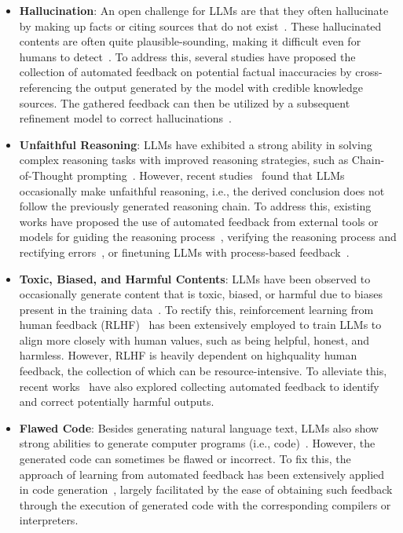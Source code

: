 \documentclass[a4paper,oneside]{book}
\begin{document}
\begin{itemize}
    \item \textbf{Hallucination}: An open challenge for LLMs are that they often hallucinate by making up facts or citing sources that do not exist~\cite{li2023halueval, zhang2023language}. These hallucinated contents are often quite plausible-sounding, making it difficult even for humans to detect~\cite{clark2021thats}. To address this, several studies have proposed the collection of automated feedback on potential factual inaccuracies by cross-referencing the output generated by the model with credible knowledge sources. The gathered feedback can then be utilized by a subsequent refinement model to correct hallucinations~\cite{gao2023rarr, zhang2023language}.

    \item \textbf{Unfaithful Reasoning}: LLMs have exhibited a strong ability in solving complex reasoning tasks with improved reasoning strategies, such as Chain-of-Thought prompting~\cite{wei2023chainofthought}. However, recent studies~\cite{golovneva2023roscoe, ribeiro2023street, lyu2023faithful} found that LLMs occasionally make unfaithful reasoning, i.e., the derived conclusion does not follow the previously generated reasoning chain. To address this, existing works have proposed the use of automated feedback from external tools or models for guiding the reasoning process~\cite{xie2023selfevaluation, yao2023tree}, verifying the reasoning process and rectifying errors~\cite{he2022rethinking, pan2023logiclm}, or finetuning LLMs with process-based feedback~\cite{huang2022large, lightman2023lets}.

    \item \textbf{Toxic, Biased, and Harmful Contents}: LLMs have been observed to occasionally generate content that is toxic, biased, or harmful due to biases present in the training data~\cite{shaikh-etal-2023-second}. To rectify this, reinforcement learning from human feedback (RLHF)~\cite{ouyang2022training, bai2022training} has been extensively employed to train LLMs to align more closely with human values, such as being helpful, honest, and harmless. However, RLHF is heavily dependent on highquality human feedback, the collection of which can be resource-intensive. To alleviate this, recent works~\cite{lu2022quark, gou2023critic} have also explored collecting automated feedback to identify and correct potentially harmful outputs.

    \item \textbf{Flawed Code}: Besides generating natural language text, LLMs also show strong abilities to generate computer programs (i.e., code)~\cite{chen2022codet}. However, the generated code can sometimes be flawed or incorrect. To fix this, the approach of learning from automated feedback has been extensively applied in code generation~\cite{chen2023teaching, olausson2023selfrepair}, largely facilitated by the ease of obtaining such feedback through the execution of generated code with the corresponding compilers or interpreters.
\end{itemize}
\end{document}
